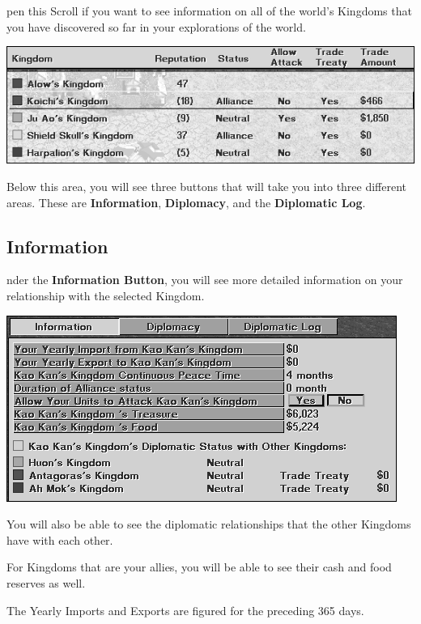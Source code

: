 pen this Scroll if you want to see information on all of the world’s Kingdoms that you have discovered so far in your explorations of the world.

\begin{center}
    \includegraphics[width=0.85\linewidth]{Ikingdoms} %
\end{center}

Below this area, you will see three buttons that will take you into three different areas. These are \textbf{Information}, \textbf{Diplomacy}, and the \textbf{Diplomatic Log}.

\subsection{\textsf{Information}}


nder the \textbf{Information Button}, you will see more detailed information on your relationship with the selected Kingdom.

\begin{center}
    \includegraphics[width=0.75\linewidth]{Ikingdoms_information} %
\end{center}

You will also be able to see the diplomatic relationships that the other Kingdoms have with each other.

For Kingdoms that are your allies, you will be able to see their cash and food reserves as well.

The Yearly Imports and Exports are figured for the preceding 365 days.


